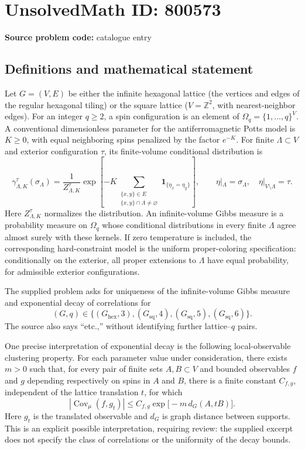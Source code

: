\documentclass[11pt]{article}
\newcommand{\Z}{\mathbb{Z}}
\begin{document}
\section*{UnsolvedMath ID: 800573}
\textbf{Source problem code:} catalogue entry
\subsection{Definitions and mathematical statement}
Let \(G=(V,E)\) be either the infinite hexagonal lattice (the vertices and edges of the regular hexagonal tiling) or the square lattice (\(V=\Z^2\), with nearest-neighbor edges). For an integer \(q\ge 2\), a spin configuration is an element of \(\Omega_q=\{1,\ldots,q\}^{V}\). A conventional dimensionless parameter for the antiferromagnetic Potts model is \(K\ge 0\), with equal neighboring spins penalized by the factor \(e^{-K}\). For finite \(\Lambda\subset V\) and exterior configuration \(\tau\), its finite-volume conditional distribution is
\[
 \gamma_{\Lambda,K}^{\tau}(\sigma_\Lambda)
 =\frac{1}{Z_{\Lambda,K}^{\tau}}
 \exp\!\left[-K\!\sum_{\substack{\{x,y\}\in E\\\{x,y\}\cap\Lambda\ne\varnothing}}
 \mathbf{1}_{\{\eta_x=\eta_y\}}\right],
 \qquad
 \eta|_\Lambda=\sigma_\Lambda,\quad
 \eta|_{V\setminus\Lambda}=\tau.
\]
Here \(Z_{\Lambda,K}^{\tau}\) normalizes the distribution. An infinite-volume Gibbs measure is a probability measure on \(\Omega_q\) whose conditional distributions in every finite \(\Lambda\) agree almost surely with these kernels. If zero temperature is included, the corresponding hard-constraint model is the uniform proper-coloring specification: conditionally on the exterior, all proper extensions to \(\Lambda\) have equal probability, for admissible exterior configurations.

The supplied problem asks for uniqueness of the infinite-volume Gibbs measure and exponential decay of correlations for
\[
 (G,q)\in
 \bigl\{(G_{\mathrm{hex}},3),
 (G_{\mathrm{sq}},4),
 (G_{\mathrm{sq}},5),
 (G_{\mathrm{sq}},6)\bigr\}.
\]
The source also says ``etc.,'' without identifying further lattice--\(q\) pairs.

One precise interpretation of exponential decay is the following local-observable clustering property. For each parameter value under consideration, there exists \(m>0\) such that, for every pair of finite sets \(A,B\subset V\) and bounded observables \(f\) and \(g\) depending respectively on spins in \(A\) and \(B\), there is a finite constant \(C_{f,g}\), independent of the lattice translation \(t\), for which
\[
 \left|\operatorname{Cov}_{\mu}(f,g_t)\right|
 \le C_{f,g}\exp\!\bigl[-m\,d_G(A,tB)\bigr].
\]
Here \(g_t\) is the translated observable and \(d_G\) is graph distance between supports. This is an explicit possible interpretation, requiring review: the supplied excerpt does not specify the class of correlations or the uniformity of the decay bounds.
\end{document}
